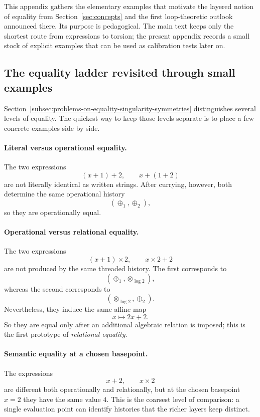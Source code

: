 This appendix gathers the elementary examples that motivate the layered notion of equality from Section~\ref{sec:concepts} and the first loop-theoretic outlook announced there. Its purpose is pedagogical. The main text keeps only the shortest route from expressions to torsion; the present appendix records a small stock of explicit examples that can be used as calibration tests later on.

\subsection{The equality ladder revisited through small examples}
\label{appE:equality-ladder}

Section~\ref{subsec:problems-on-equality-singularity-symmetries} distinguishes several levels of equality. The quickest way to keep those levels separate is to place a few concrete examples side by side.

\paragraph{Literal versus operational equality.}
The two expressions
\[
(x+1)+2,
\qquad
x+(1+2)
\]
are not literally identical as written strings. After currying, however, both determine the same operational history
\[
(\oplus_1,\oplus_2),
\]
so they are operationally equal.

\paragraph{Operational versus relational equality.}
The two expressions
\[
(x+1)\times 2,
\qquad
x\times 2+2
\]
are not produced by the same threaded history. The first corresponds to
\[
(\oplus_1,\otimes_{\log 2}),
\]
whereas the second corresponds to
\[
(\otimes_{\log 2},\oplus_2).
\]
Nevertheless, they induce the same affine map
\[
x\longmapsto 2x+2.
\]
So they are equal only after an additional algebraic relation is imposed; this is the first prototype of \emph{relational equality}.

\paragraph{Semantic equality at a chosen basepoint.}
The expressions
\[
x+2,
\qquad
x\times 2
\]
are different both operationally and relationally, but at the chosen basepoint $x=2$ they have the same value $4$. This is the coarsest level of comparison: a single evaluation point can identify histories that the richer layers keep distinct.

